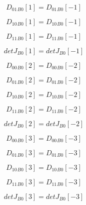 \documentclass{article}
\begin{document}
\begin{dmath}{D_{01}{_{B0}}}[{1}] = {D_{01}{_{B0}}}[{-1}]\end{dmath}

\begin{dmath}{D_{10}{_{B0}}}[{1}] = {D_{10}{_{B0}}}[{-1}]\end{dmath}

\begin{dmath}{D_{11}{_{B0}}}[{1}] = {D_{11}{_{B0}}}[{-1}]\end{dmath}

\begin{dmath}{detJ{_{B0}}}[{1}] = {detJ{_{B0}}}[{-1}]\end{dmath}

\begin{dmath}{D_{00}{_{B0}}}[{2}] = {D_{00}{_{B0}}}[{-2}]\end{dmath}

\begin{dmath}{D_{01}{_{B0}}}[{2}] = {D_{01}{_{B0}}}[{-2}]\end{dmath}

\begin{dmath}{D_{10}{_{B0}}}[{2}] = {D_{10}{_{B0}}}[{-2}]\end{dmath}

\begin{dmath}{D_{11}{_{B0}}}[{2}] = {D_{11}{_{B0}}}[{-2}]\end{dmath}

\begin{dmath}{detJ{_{B0}}}[{2}] = {detJ{_{B0}}}[{-2}]\end{dmath}

\begin{dmath}{D_{00}{_{B0}}}[{3}] = {D_{00}{_{B0}}}[{-3}]\end{dmath}

\begin{dmath}{D_{01}{_{B0}}}[{3}] = {D_{01}{_{B0}}}[{-3}]\end{dmath}

\begin{dmath}{D_{10}{_{B0}}}[{3}] = {D_{10}{_{B0}}}[{-3}]\end{dmath}

\begin{dmath}{D_{11}{_{B0}}}[{3}] = {D_{11}{_{B0}}}[{-3}]\end{dmath}

\begin{dmath}{detJ{_{B0}}}[{3}] = {detJ{_{B0}}}[{-3}]\end{dmath}
\end{document}
